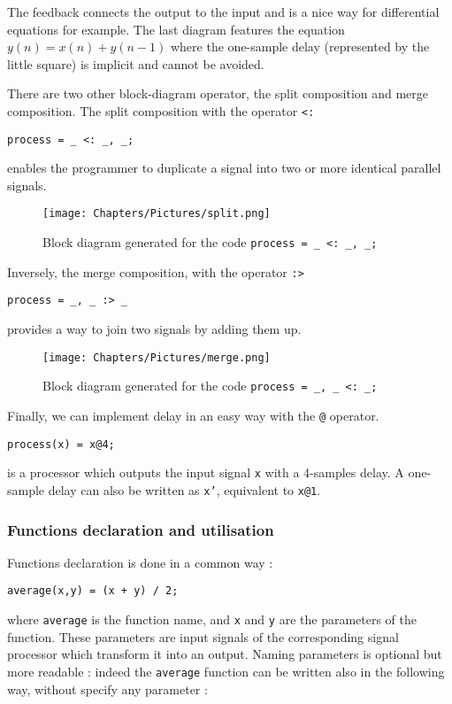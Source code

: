 The feedback connects the output to the input and is a nice way for differential equations for example. The last diagram features the equation $y(n) = x(n) + y(n-1)$ where the one-sample delay (represented by the little square) is implicit and cannot be avoided.

There are two other block-diagram operator, the split composition and merge composition. The split composition with the operator \texttt{<:}\\
\centerline{\texttt{process = \_ <: \_, \_;}}
enables the programmer to duplicate a signal into two or more identical parallel signals.

\begin{figure}[h]
    \centering
    \texttt{[image: Chapters/Pictures/split.png]}
    \caption{Block diagram generated for the code \texttt{process = \_ <: \_, \_;}}
    \label{fig:split}
\end{figure}

Inversely, the merge composition, with the operator \texttt{:>}\\
\centerline{\texttt{process = \_, \_ :> \_}}
provides a way to join two signals by adding them up.

\begin{figure}[h]
    \centering
    \texttt{[image: Chapters/Pictures/merge.png]}
    \caption{Block diagram generated for the code \texttt{process = \_, \_ <: \_;}}
    \label{fig:merge}
\end{figure}


Finally, we can implement delay in an easy way with the \texttt{@} operator.\\
\centerline{\texttt{process(x) = x@4;}} is a processor which outputs the input signal \texttt{x} with a 4-samples delay. A one-sample delay can also be written as \texttt{x'}, equivalent to \texttt{x@1}.

\subsubsection*{Functions declaration and utilisation}

Functions declaration is done in a common way :

\centerline{\texttt{average(x,y) = (x + y) / 2;}}

where \texttt{average} is the function name, and \texttt{x} and \texttt{y} are the parameters of the function. These parameters are input signals of the corresponding signal processor which transform it into an output. Naming parameters is optional but more readable : indeed the \texttt{average} function can be written also in the following way, without specify any parameter :

